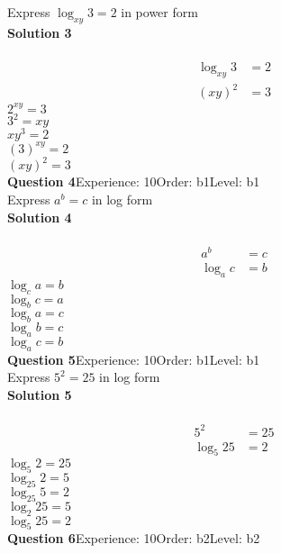\documentclass{article}
\begin{document}
Express $\log_{xy}3=2$ in power form\\[4pt]
\noindent\textbf{Solution 3}\\[2pt]
\\[-10pt]\begin{align*}
\log_{xy}3&=2\\[2pt]
(xy)^2&=3
\end{align*}
$2^{xy}=3$\\
$3^2=xy$\\
$xy^{3}=2$\\
$(3)^{xy}=2$\\
$(xy)^2=3$\\
\noindent\textbf{Question 4}\hspace{20pt}Experience: 10\hspace{20pt}Order: b1\hspace{20pt}Level: b1\\[2pt]
Express $a^b=c$ in log form\\[4pt]
\noindent\textbf{Solution 4}\\[2pt]
\\[-10pt]\begin{align*}
a^b&=c\\[2pt]
\log_ac&=b
\end{align*}
$\log_ca=b$\\
$\log_bc=a$\\
$\log_ba=c$\\
$\log_ab=c$\\
$\log_ac=b$\\
\noindent\textbf{Question 5}\hspace{20pt}Experience: 10\hspace{20pt}Order: b1\hspace{20pt}Level: b1\\[2pt]
Express $5^2=25$ in log form\\[4pt]
\noindent\textbf{Solution 5}\\[2pt]
\\[-10pt]\begin{align*}
5^2&=25\\[2pt]
\log_{5}25&=2
\end{align*}
$\log_{5}2=25$\\
$\log_{25}2=5$\\
$\log_{25}5=2$\\
$\log_{2}25=5$\\
$\log_{5}25=2$\\
\noindent\textbf{Question 6}\hspace{20pt}Experience: 10\hspace{20pt}Order: b2\hspace{20pt}Level: b2\\[2pt]
\end{document}
